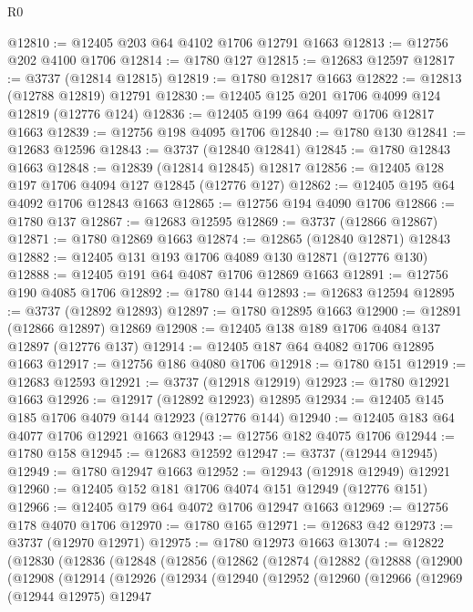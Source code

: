 \begin{lexlean}{R0}
\begin{coremodule}
@12810 := @12405 @203 @64 @4102 @1706 @12791 @1663
@12813 := @12756 @202 @4100 @1706
@12814 := @1780 @127
@12815 := @12683 @12597
@12817 := @3737 (@12814 @12815)
@12819 := @1780 @12817 @1663
@12822 := @12813 (@12788 @12819) @12791
@12830 := @12405 @125 @201 @1706 @4099 @124 @12819 (@12776 @124)
@12836 := @12405 @199 @64 @4097 @1706 @12817 @1663
@12839 := @12756 @198 @4095 @1706
@12840 := @1780 @130
@12841 := @12683 @12596
@12843 := @3737 (@12840 @12841)
@12845 := @1780 @12843 @1663
@12848 := @12839 (@12814 @12845) @12817
@12856 := @12405 @128 @197 @1706 @4094 @127 @12845 (@12776 @127)
@12862 := @12405 @195 @64 @4092 @1706 @12843 @1663
@12865 := @12756 @194 @4090 @1706
@12866 := @1780 @137
@12867 := @12683 @12595
@12869 := @3737 (@12866 @12867)
@12871 := @1780 @12869 @1663
@12874 := @12865 (@12840 @12871) @12843
@12882 := @12405 @131 @193 @1706 @4089 @130 @12871 (@12776 @130)
@12888 := @12405 @191 @64 @4087 @1706 @12869 @1663
@12891 := @12756 @190 @4085 @1706
@12892 := @1780 @144
@12893 := @12683 @12594
@12895 := @3737 (@12892 @12893)
@12897 := @1780 @12895 @1663
@12900 := @12891 (@12866 @12897) @12869
@12908 := @12405 @138 @189 @1706 @4084 @137 @12897 (@12776 @137)
@12914 := @12405 @187 @64 @4082 @1706 @12895 @1663
@12917 := @12756 @186 @4080 @1706
@12918 := @1780 @151
@12919 := @12683 @12593
@12921 := @3737 (@12918 @12919)
@12923 := @1780 @12921 @1663
@12926 := @12917 (@12892 @12923) @12895
@12934 := @12405 @145 @185 @1706 @4079 @144 @12923 (@12776 @144)
@12940 := @12405 @183 @64 @4077 @1706 @12921 @1663
@12943 := @12756 @182 @4075 @1706
@12944 := @1780 @158
@12945 := @12683 @12592
@12947 := @3737 (@12944 @12945)
@12949 := @1780 @12947 @1663
@12952 := @12943 (@12918 @12949) @12921
@12960 := @12405 @152 @181 @1706 @4074 @151 @12949 (@12776 @151)
@12966 := @12405 @179 @64 @4072 @1706 @12947 @1663
@12969 := @12756 @178 @4070 @1706
@12970 := @1780 @165
@12971 := @12683 @42
@12973 := @3737 (@12970 @12971)
@12975 := @1780 @12973 @1663
@13074 := @12822
    (@12830
      (@12836
        (@12848
          (@12856
            (@12862
              (@12874
                (@12882
                  (@12888
                    (@12900
                      (@12908
                        (@12914
                          (@12926
                            (@12934
                              (@12940
                                (@12952
                                  (@12960
                                    (@12966
                                      (@12969
                                        (@12944 @12975)
                                        @12947

\end{coremodule}
\end{lexlean}
